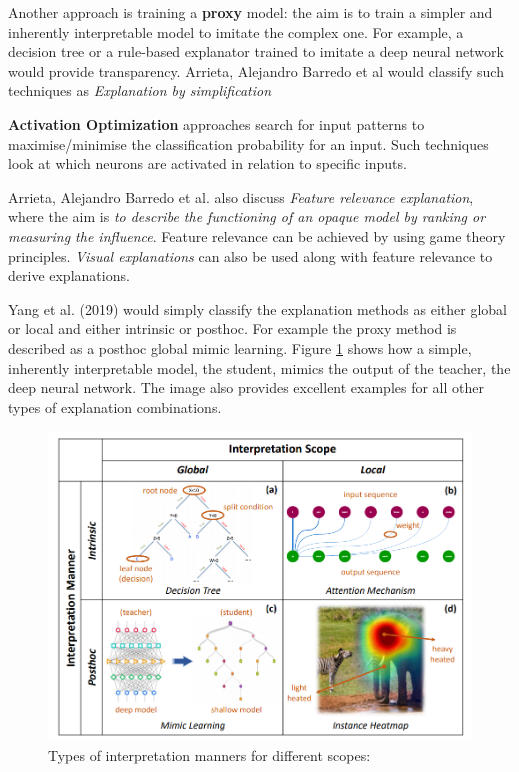 \documentclass[proposal]{softeng}
\begin{document}
Another approach is training a \textbf{proxy} model: the aim is to train a simpler and inherently interpretable model to imitate the complex one. For example, a decision tree or a rule-based explanator trained to imitate a deep neural network would provide transparency. Arrieta, Alejandro Barredo et al \cite{BarredoArrietaAlejandro2020EAIX} would classify such techniques as \textit{Explanation by simplification}

\textbf{Activation Optimization} approaches search for input patterns to maximise/minimise the classification probability for an input. Such techniques look at which neurons are activated in relation to specific inputs.

Arrieta, Alejandro Barredo et al. also discuss \textit{Feature relevance explanation}, where the aim is \textit{to describe the functioning of an opaque model by ranking or measuring the influence}. Feature relevance can be achieved by using game theory principles. \textit{Visual explanations} can also be used along with feature relevance to derive explanations.

Yang et al. (2019) would simply classify the explanation methods as either global or local and either intrinsic or posthoc. For example the proxy method is described as a posthoc global mimic learning. Figure \ref{fig:interpretation_scope} shows how a simple, inherently interpretable model, the student, mimics the output of the teacher, the deep neural network. The image also provides excellent examples for all other types of explanation combinations.

\begin{figure}[h!]
\centering

\includegraphics[width=.8\textwidth]{images/interpretation_scope.png}

\caption{Types of interpretation manners for different scopes:\cite{YangFan2019EEWG}}

\label{fig:interpretation_scope}
\end{figure}
\end{document}
